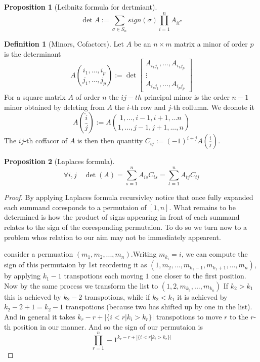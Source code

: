 \documentclass{tufte-book} %
\theoremstyle{definition}
\newtheorem{definition}{Definition}
\theoremstyle{theorem}
\theoremstyle{proposition}
\newtheorem*{proposition}{Proposition}
\theoremstyle{lemma}
\theoremstyle{corolarry}
\begin{document}
\begin{proposition}[Leibnitz formula for dertmiant]
 $$ \det{A} := \sum_{\sigma \in S_n} sign(\sigma) \prod_{i=1}^n A_{ii^\sigma}$$
  
\end{proposition}

\begin{definition}[Minors, Cofactors]
  Let $A$ be an $n \times m$ matrix a minor of order $p$ is the determinant 
  $$ A\binom{i_1,...,i_p}{j_1,...,j_p}  := \det \begin{bmatrix} A_{i_1j_1},..., A_{i_1j_p}  \\ \vdots \\ A_{i_pj_1},...,A_{i_pj_p} \end{bmatrix}$$
  For a square matrix $A$ of order $n$ the $ij-th$ principal minor is the order $n-1$ minor obtained by deleting from $A$ the $i$-th row and $j$-th collumn. 
  We deonote it $$A\binom{\hat{i}}{\hat{j}} := A\binom{1,...,i-1,i+1,...n}{1,...,j-1,j+1,...,n}$$
  The $ij$-th coffacor of $A$ is then then quantity $C_{ij} := (-1)^{i+j}A\binom{\hat{i}}{\hat{j}}.$
\end{definition}

\begin{proposition}[Laplaces formula]
  $$\forall{i,j} \quad  \det(A) = \sum_{s=1}^n A_{is}C_{is} = \sum_{t=1}^n A_{tj}C_{tj}$$

\end{proposition}

\begin{proof}
  By applying Laplaces formula recursivley notice that once fully expanded each summand coresponds to a permutaion of $[1,n]$. 
What remains to be determined is how the product of signs appearing in front of each summand relates to the sign of the coresponding permutaion. To do so we turn now to a problem whos relation to our aim may not be immediately appearent. \linebreak
\par{
  \quad consider a permuation $(m_1,m_2,...,m_n)$.Writing $m_{k_i} = i$, we can compute the sign of this permutaion by 1st reordering it as $(1,m_2,...,m_{k_1-1},m_{k_1+1},...,m_n)$, by applying $k_1-1$ transpotions each moving $1$ one closer to the first position.
   Now by the same process we transform the list to $(1,2,m_{k_3},...,m_{k_n})$ If $k_2 > k_1$ this is achieved by $k_2 - 2$ transpotions, while if $k_2 < k_1$ it is achieved by $k_2 - 2 +1 = k_2 - 1$ transpotions (because two has shifted up by one in the list).
   And in general it takes $k_r - r + |\{i < r | k_i > k_r\}|$ transpotions to move $r$ to the $r$-th position in our manner. And so the sign of our permutaion is $$ \prod_{r=1}^n -1^{k_r - r + |\{i < r | k_i > k_r\}|}$$ 
 }
\end{proof}
\end{document}
